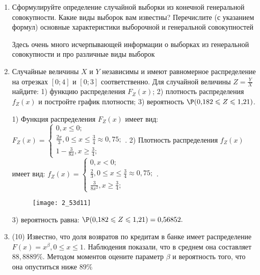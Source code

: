 \documentclass[a4paper,12pt]{article}
\begin{document}
\begin{enumerate}


\item


Сформулируйте определение случайной выборки из конечной генеральной совокупности. Какие
виды выборок вам известны? Перечислите (с указанием формул) основные характеристики выборочной и генеральной совокупностей




Здесь очень много исчерпывающей информации о выборках из генеральной совокупности и про различные виды выборок


\item



Случайные величины $X$ и $Y$ независимы и имеют равномерное
распределение на отрезках $[0;4]$ и $[0;3]$ соответственно. Для случайной величины $Z=\frac{Y}{X}$ найдите: 
1) функцию распределения $F_Z(x)$;
2) плотность распределения $f_Z(x)$ и постройте график плотности;
3) вероятность $\P(0,\!182\leqslant Z\leqslant 1,\!21)$.




1) Функция распределения $F_Z(x)$ имеет вид:
$
F_Z(x)=\left\{
\begin{array}{l}
0, x\leqslant 0;\\
\frac{2 x}{3}, 0\leqslant x\leqslant \frac{3}{4}\approx 0,\!75;\\
1 - \frac{3}{8 x}, x\geqslant\frac{3}{4};
\end{array}.
\right.
$
2) Плотность распределения $f_Z(x)$ имеет вид:
$
f_Z(x)=\left\{
\begin{array}{l}
0, x<0;\\
\frac{2}{3}, 0\leqslant x\leqslant \frac{3}{4}\approx 0,\!75;\\
\frac{3}{8 x^{2}}, x\geqslant\frac{3}{4};
\end{array}.
\right.
$


\begin{figure}[H]
    \texttt{[image: 2\_53d11]}
\end{figure}


3) вероятность равна:
$
\P(0,\!182\leqslant Z\leqslant 1,\!21)=
0,\!56852.
$


\item


(10) Известно, что доля возвратов по кредитам в банке имеет распределение $F(x) = x ^{\beta}, 0 \leqslant x \leqslant 1$.
Наблюдения показали, что в среднем она составляет $88,8889\%$. Методом моментов оцените параметр $\beta$ и
вероятность того, что она опуститься ниже $89\%$





\end{enumerate}
\end{document}
